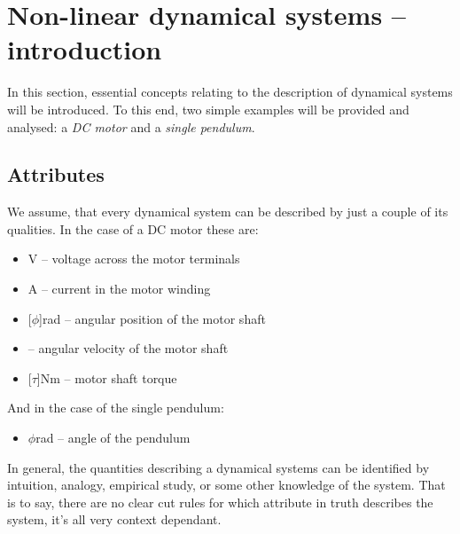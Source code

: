 
\chapter{Non-linear dynamical systems -- introduction}

In this section, essential concepts relating to the description of dynamical systems will be introduced. 
To this end, two simple examples will be provided and analysed: a \textit{DC motor} and a \textit{single pendulum}.

\section{Attributes}
We assume, that every dynamical system can be described by just a couple of its qualities.
In the case of a DC motor these are:
\begin{itemize}
    \item \unit[U]{V} -- voltage across the motor terminals
    \item \unit[I]{A} -- current in the motor winding
    \item \unit[$\phi$]{rad} -- angular position of the motor shaft
    \item {} -- angular velocity of the motor shaft
    \item \unit[$\tau$]{Nm} -- motor shaft torque
\end{itemize}
And in the case of the single pendulum:
\begin{itemize}
    \item $\phi$\unit{rad} -- angle of the pendulum
\end{itemize}
In general, the quantities describing a dynamical systems can be identified by intuition, analogy, empirical study, or some other knowledge of the system.
That is to say, there are no clear cut rules for which attribute in truth describes the system, it's all very context dependant.
